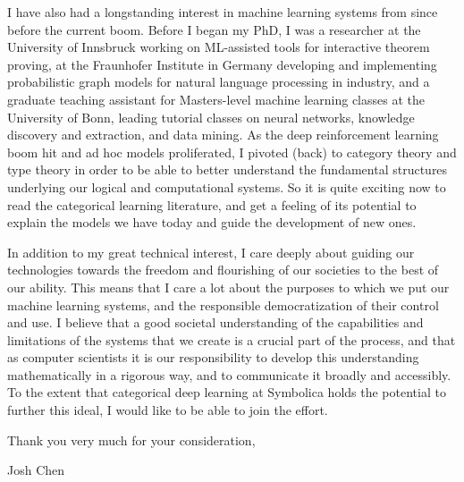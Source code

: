 \documentclass[11pt]{article}
\begin{document}
I have also had a longstanding interest in machine learning systems from since before the current boom.
Before I began my PhD, I was a researcher at the University of Innsbruck working on ML-assisted tools for interactive theorem proving, at the Fraunhofer Institute in Germany developing and implementing probabilistic graph models for natural language processing in industry, and a graduate teaching assistant for Masters-level machine learning classes at the University of Bonn, leading tutorial classes on neural networks, knowledge discovery and extraction, and data mining.
As the deep reinforcement learning boom hit and ad hoc models proliferated, I pivoted (back) to category theory and type theory in order to be able to better understand the fundamental structures underlying our logical and computational systems.
So it is quite exciting now to read the categorical learning literature, and get a feeling of its potential to explain the models we have today and guide the development of new ones.

In addition to my great technical interest, I care deeply about guiding our technologies towards the freedom and flourishing of our societies to the best of our ability. This means that I care a lot about the purposes to which we put our machine learning systems, and the responsible democratization of their control and use. I believe that a good societal understanding of the capabilities and limitations of the systems that we create is a crucial part of the process, and that as computer scientists it is our responsibility to develop this understanding mathematically in a rigorous way, and to communicate it broadly and accessibly. To the extent that categorical deep learning at Symbolica holds the potential to further this ideal, I would like to be able to join the effort.

\noindent Thank you very much for your consideration,

Josh Chen
\end{document}
